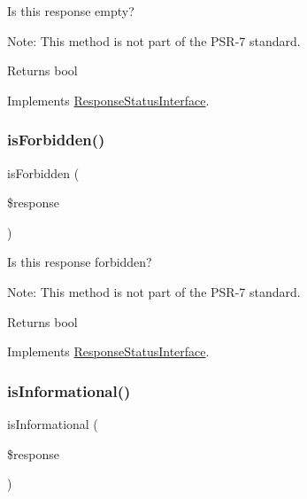 Is this response empty?

Note\+: This method is not part of the P\+S\+R-\/7 standard.

\begin{DoxyReturn}{Returns}
bool 
\end{DoxyReturn}


Implements \mbox{\hyperlink{interface_pes_1_1_http_1_1_response_status_interface_a5166ac30ac60791ad8c30d76038b9371}{Response\+Status\+Interface}}.

\mbox{\label{class_pes_1_1_http_1_1_response_status_aa0084ca7689eec6f23e6ea5f30e228fa}} 
\subsubsection{\texorpdfstring{is\+Forbidden()}{isForbidden()}}
{\footnotesize\ttfamily is\+Forbidden (\begin{DoxyParamCaption}\item[{Response\+Interface}]{\$response }\end{DoxyParamCaption})}

Is this response forbidden?

Note\+: This method is not part of the P\+S\+R-\/7 standard.

\begin{DoxyReturn}{Returns}
bool  
\end{DoxyReturn}


Implements \mbox{\hyperlink{interface_pes_1_1_http_1_1_response_status_interface_aa0084ca7689eec6f23e6ea5f30e228fa}{Response\+Status\+Interface}}.

\mbox{\label{class_pes_1_1_http_1_1_response_status_aefe91e716fcd58aed7eea5eade4b7cc0}} 
\subsubsection{\texorpdfstring{is\+Informational()}{isInformational()}}
{\footnotesize\ttfamily is\+Informational (\begin{DoxyParamCaption}\item[{Response\+Interface}]{\$response }\end{DoxyParamCaption})}

